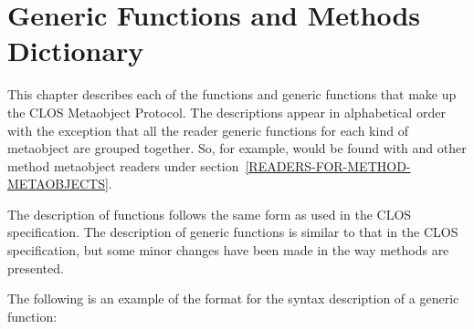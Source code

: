 \section{Generic Functions and Methods Dictionary}

This chapter describes each of the functions and generic functions that make up
the CLOS Metaobject Protocol. The descriptions appear in alphabetical order with
the exception that all the reader generic functions for each kind of metaobject
are grouped together. So, for example,  would be found with
 and other method metaobject readers under
section~\ref{READERS-FOR-METHOD-METAOBJECTS}.

The description of functions follows the same form as used in the CLOS
specification. The description of generic functions is similar to that in the
CLOS specification, but some minor changes have been made in the way methods are
presented. 

The following is an example of the format for the syntax description of a
generic function:

